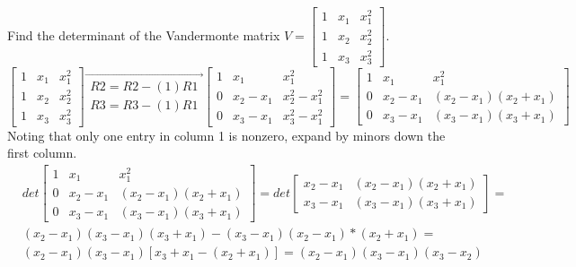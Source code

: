 \documentclass[../main.tex]{subfiles}
\begin{document}
\begin{example} \label{ex:4_13}
  Find the determinant of the Vandermonte matrix \(V = \begin{bmatrix}
    1 & x_{1} & x_{1}^{2}\\
    1 & x_{2} & x_{2}^{2}\\
    1 & x_{3} & x_{3}^{2}
  \end{bmatrix}\).
  \begin{equation*}
    \begin{bmatrix}
      1 & x_{1} & x_{1}^{2}\\
      1 & x_{2} & x_{2}^{2}\\
      1 & x_{3} & x_{3}^{2}
    \end{bmatrix}
    \overrightarrow{\substack{R2 = R2 - (1)R1 \\ R3 = R3 - (1)R1}}
    \begin{bmatrix}
      1 & x_{1} & x_{1}^{2}\\
      0 & x_{2} - x_{1} & x_{2}^{2} - x_{1}^{2}\\
      0 & x_{3} - x_{1} & x_{3}^{2} - x_{1}^{2}
    \end{bmatrix}
    =\begin{bmatrix}
      1 & x_{1} & x_{1}^{2}\\
      0 & x_{2} - x_{1} & (x_{2} - x_{1})(x_{2} + x_{1})\\
      0 & x_{3} - x_{1} & (x_{3} - x_{1})(x_{3} + x_{1})
    \end{bmatrix}
  \end{equation*}
  Noting that only one entry in column 1 is nonzero, expand by minors down the first column.
  \begin{equation*}
    \begin{aligned}
      &det\begin{bmatrix}
        1 & x_{1} & x_{1}^{2}\\
        0 & x_{2} - x_{1} & (x_{2} - x_{1})(x_{2} + x_{1})\\
        0 & x_{3} - x_{1} & (x_{3} - x_{1})(x_{3} + x_{1})
      \end{bmatrix}
      =det\begin{bmatrix}
        x_{2} - x_{1} & (x_{2} - x_{1})(x_{2} + x_{1})\\
        x_{3} - x_{1} & (x_{3} - x_{1})(x_{3} + x_{1})
      \end{bmatrix}=\\
      &(x_2 - x_1)(x_3 - x_1)(x_3 + x_1) - (x_3 - x_1)(x_2 - x_1)*(x_2+x_1) = \\
      &(x_2 - x_1)(x_3 - x_1)[x_3 + x_1 - (x_2 + x_1)] = (x_2 - x_1)(x_3 - x_1)(x_3 - x_2)
    \end{aligned}
  \end{equation*}
\end{example}
\end{document}
